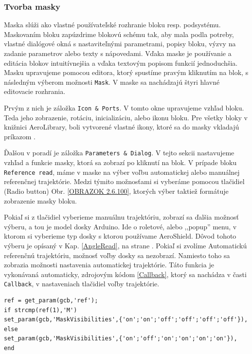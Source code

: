 \newpage
\subsubsection{Tvorba masky}
\label{Maska}

Maska slúži ako vlastné používateľské rozhranie bloku resp. podsystému. Maskovaním bloku zapúzdrime blokovú schému tak, aby mala podla potreby, vlastné dialógové okná s nastaviteľnými parametrami, popisy bloku, výzvy na zadanie parametrov alebo texty s nápovedami. Vďaka maske je používanie a editácia blokov intuitívnejšia a vďaka textovým popisom funkcií jednoduchšia. Masku upravujeme pomocou editora, ktorý spustíme pravým kliknutím na blok, s následným výberom možnosti \verb|Mask|. V maske sa nachádzajú štyri hlavné editovacie rozhrania. 

Prvým z nich je záložka \verb|Icon & Ports|. V tomto okne upravujeme vzhľad bloku. Teda jeho zobrazenie, rotáciu, inicializáciu, alebo ikonu bloku. Pre všetky bloky v knižnici AeroLibrary, boli vytvorené vlastné ikony, ktoré sa do masky vkladajú príkazom .

Ďalšou v poradí je záložka \verb|Parameters & Dialog|. V tejto sekcii nastavujeme vzhľad a funkcie masky, ktorá sa zobrazí po kliknutí na blok. V prípade bloku \verb|Reference read|, máme v maske na výber voľbu automatickej alebo manuálnej referenčnej trajektórie. Medzi týmito možnosťami si vyberáme pomocou tlačidiel (Radio button) Obr. \ref{OBRAZOK 2.6.100}, ktorých výber taktiež formátuje zobrazenie masky bloku. 

Pokiaľ si z tlačidiel vyberieme manuálnu trajektóriu, zobrazí sa ďalšia možnosť výberu, a tou je model dosky Arduino. Ide o roletové, alebo ,,popup'' menu, v ktorom si vyberieme typ dosky s ktorou používame AeroShield. Dôvod tohoto výberu je opísaný v Kap. \ref{AngleRead}, na strane \pageref{AngleRead}. Pokiaľ si zvolíme Automatickú referenčnú trajektóriu, možnosť voľby dosky sa nezobrazí. Namiesto toho sa zobrazia možnosti nastavenia automatickej trajektórie. Táto funkcia je vykonávaná automaticky, zdrojovým kódom \ref{Callback}, ktorý sa nachádza v časti \verb|Callback|, v nastaveniach tlačidiel voľby trajektórie. 

\begin{lstlisting}[caption={Callback funkcia.},captionpos=b,label=Callback]
ref = get_param(gcb,'ref');
if strcmp(ref(1),'M')
set_param(gcb,'MaskVisibilities',{'on';'on';'off';'off';'off';'off'}),
else
set_param(gcb,'MaskVisibilities',{'on';'off';'on';'on';'on';'on'}),
end
\end{lstlisting}

